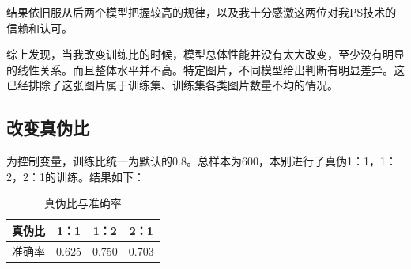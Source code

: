 \documentclass[boldfont,linespread=1.35]{ctexart}
\begin{document}
结果依旧服从后两个模型把握较高的规律，以及我十分感激这两位对我PS技术的信赖和认可。

综上发现，当我改变训练比的时候，模型总体性能并没有太大改变，至少没有明显的线性关系。而且整体水平并不高。特定图片，不同模型给出判断有明显差异。这已经排除了这张图片属于训练集、训练集各类图片数量不均的情况。

\subsection{改变真伪比}
为控制变量，训练比统一为默认的0.8。总样本为600，本别进行了真伪1：1，1：2，2：1的训练。结果如下：
\begin{table} [h]
	\centering
	\caption{真伪比与准确率}
	\begin{tabular}
		{cccc}
		\toprule[1pt]
		\rowcolor[gray]{0.9} 真伪比 &1：1 &1：2 &2：1\\
		\midrule
		准确率   &0.625 &0.750 &0.703\\
		\bottomrule[1pt]
	\end{tabular}
\end{table}
\end{document}

